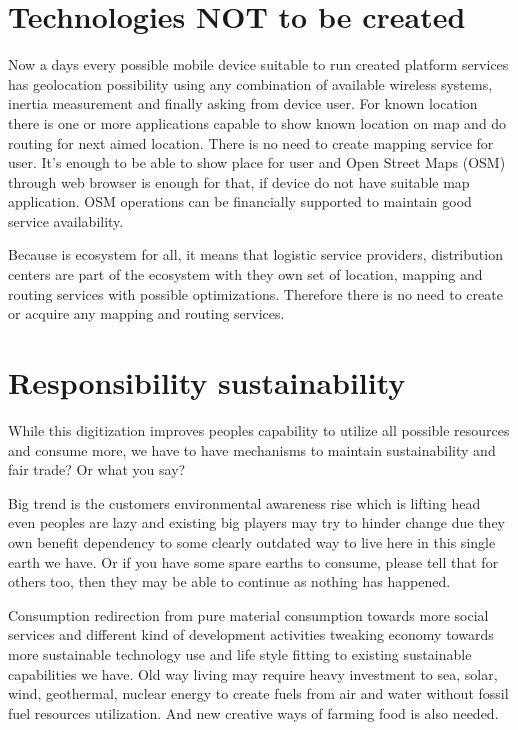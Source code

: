 \section{Technologies NOT to be created}
\label{technologies sourced}
Now a days every possible mobile device suitable to run created platform
services has geolocation possibility using any combination of available
wireless systems, inertia measurement and finally asking from device user.
For known location there is one or more applications capable to show known
location on map and do routing for next aimed location. There is no need
to create mapping service for user. It's enough to be able to show place
for user and Open Street Maps (OSM) through web browser is enough for that,
if device do not have suitable map application. OSM operations can be
financially supported to maintain good service availability. 

Because is ecosystem for all, it means that logistic service providers,
distribution centers are part of the ecosystem with they own set of location,
mapping and routing services with possible optimizations.
Therefore there is no need to create or acquire any mapping and routing
services.

\section{Responsibility sustainability}
\label{responsibility_sustainability}

While this digitization improves peoples capability to utilize all possible
resources and consume more, we have to have mechanisms to maintain
sustainability and fair trade? Or what you say?

Big trend is the customers environmental awareness rise which is lifting head
even peoples are lazy and existing big players may try to hinder change due
they own  benefit dependency to some clearly outdated way to live here in this
single earth we have. Or if you have some spare earths to consume, please tell
that for others too, then they may be able to continue as nothing has
happened.

Consumption redirection from pure material consumption towards more social
services and different kind of development activities tweaking economy towards
more sustainable technology use and life style fitting to existing sustainable
capabilities we have. Old way living may require heavy investment to sea,
solar, wind, geothermal, nuclear energy to create fuels from air and water
without fossil fuel resources utilization. And new creative ways of farming
food is also needed.

